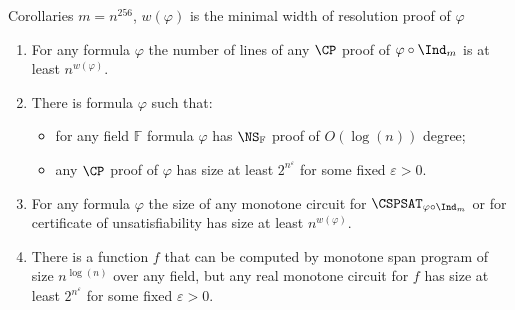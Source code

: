 \begin{frame}{Corollaries}
    $m = n^{256}$, $w(\varphi)$ is the minimal width of resolution proof of $\varphi$

    \pause
    \begin{enumerate}
        \item For any formula $\varphi$ the number of lines of any $\CP$ proof of $\varphi \circ \Ind_m$
            is at least $n^{w(\varphi)}$.
        \pause
        \item There is formula $\varphi$ such that:
            \begin{itemize}
                \item for any field $\mathbb{F}$ formula $\varphi$ has $\NS_{\mathbb{F}}$ proof of
                    $O(\log(n))$ degree;
                \item any $\CP$ proof of $\varphi$ has size at least $2^{n^{\varepsilon}}$ for some fixed
                    $\varepsilon > 0$.
            \end{itemize}
        \pause
        \item For any formula $\varphi$ the size of any monotone circuit for $\CSPSAT_{\varphi \circ
            \Ind_m}$ or for certificate of unsatisfiability has size at least $n^{w(\varphi)}$.
        \pause
        \item There is a function $f$ that can be computed by monotone span program of size $n^{\log(n)}$
            over any field, but any real monotone circuit for $f$ has size at least $2^{n^{\varepsilon}}$
            for some fixed $\varepsilon > 0$.
    \end{enumerate}
\end{frame}

